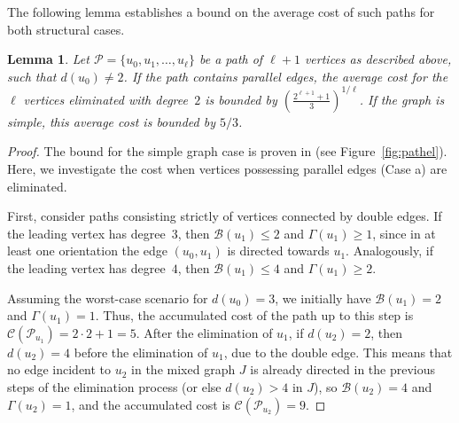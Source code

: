 \documentclass{article}
\newtheorem{lemma}{Lemma}
\begin{document}
        The following lemma establishes a bound on the average cost of such paths for both structural cases.

        \begin{lemma}\label{lem:path}
            Let $\mathcal{P} = \{u_0, u_1, \dots, u_\ell\}$ be a path of $\ell+1$ vertices as described above, such that $d(u_0) \neq 2$. 
            If the path contains parallel edges, the average cost for the $\ell$ vertices eliminated with degree~$2$ is bounded by $\left(\displaystyle\frac{2^{\ell+1}+1}{3}\right)^{1/\ell}$. 
            If the graph is simple, this average cost is bounded by $5/3$.
        \end{lemma}
        \begin{proof}
            The bound for the simple graph case is proven in \cite{bet} (see Figure~\ref{fig:pathel}). 
            Here, we investigate the cost when vertices possessing parallel edges (Case a) are eliminated.
            
             First, consider paths consisting strictly of vertices connected by double edges.
             If the leading vertex has degree~$3$, then $\mathcal{B}(u_1)\leq 2$ and $\Gamma(u_1)\geq 1$, since in at least one orientation the edge $(u_0,u_1)$ is directed towards $u_1$. 
             Analogously, if the leading vertex has degree~$4$, then $\mathcal{B}(u_1)\leq 4$ and $\Gamma(u_1)\geq 2$.
             
             Assuming the worst-case scenario for $d(u_0)=3$, we initially have $\mathcal{B}(u_1)= 2$ and $\Gamma(u_1)= 1$. 
             Thus, the accumulated cost of the path up to this step is $\mathcal{C}(\mathcal{P}_{u_1})= 2\cdot 2 + 1 = 5$. 
             After the elimination of $u_1$, if $d(u_2)=2$, then $d(u_2)=4$ before the elimination of $u_1$, due to the double edge.
             This means that no edge incident to $u_2$ in the mixed graph $J$ is already directed in the previous steps of the elimination process (or else $d(u_2)>4$ in $J$), so $\mathcal{B}(u_2)= 4$ and $\Gamma(u_2)= 1$, and the accumulated cost is 
            $\mathcal{C}(\mathcal{P}_{u_2})=9$.
            

\end{proof}
\end{document}
